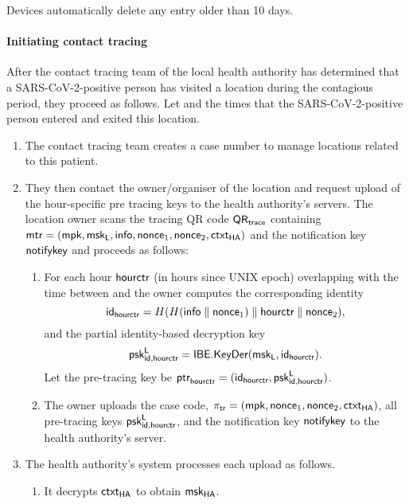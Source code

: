 Devices automatically delete any entry older than 10 days.

\paragraph{Initiating contact tracing}
After the contact tracing team of the local health authority has determined that a SARS-CoV-2-positive person has visited a location during the contagious period, they proceed as follows. Let \entryplus and \exitplus the times that the SARS-CoV-2-positive person entered and exited this location.
\begin{enumerate}
\item The contact tracing team creates a case number to manage locations related to this patient.
\item They then contact the owner/organiser of the location and request upload of the hour-specific pre tracing keys to the health authority's servers. The location owner scans the tracing QR code $\textsf{QR}_{\textsf{trace}}$ containing $\textsf{mtr} = (\textsf{mpk}, \textsf{msk}_{\textsf{L}}, \textsf{info}, \textsf{nonce}_1,\textsf{nonce}_2, \textsf{ctxt}_{\textsf{HA}})$ and the notification key $\textsf{notifykey}$ and proceeds as follows:
  \begin{enumerate}
  \item For each hour $\textsf{hourctr}$ (in hours since UNIX epoch) overlapping with the time between \entryplus and \exitplus the owner computes the corresponding identity
    \begin{equation*}
      \textsf{id}_{\textsf{hourctr}} = H( H(\textsf{info} \parallel \textsf{nonce}_1) \parallel \textsf{hourctr} \parallel \textsf{nonce}_2),
    \end{equation*}
    and the partial identity-based decryption key
    \begin{equation*}
      \textsf{psk}_{\textsf{id},\textsf{hourctr}}^{\textsf{L}} = \textsf{IBE.KeyDer}(\textsf{msk}_{\textsf{L}}, \textsf{id}_{\textsf{hourctr}}).
    \end{equation*}
    Let the pre-tracing key be $\textsf{ptr}_{\textsf{hourctr}} = (\textsf{id}_{\textsf{hourctr}}, \textsf{psk}_{\textsf{id},\textsf{hourctr}}^{\textsf{L}})$.
    \item The owner uploads the case code, $\pi_{\textsf{tr}} = (\textsf{mpk},\allowbreak \textsf{nonce}_1,\allowbreak \textsf{nonce}_2, \textsf{ctxt}_{\textsf{HA}})$, all pre-tracing keys $\textsf{psk}_{\textsf{id},\textsf{hourctr}}^{\textsf{L}}$, and the notification key $\textsf{notifykey}$ to the health authority's server.
  \end{enumerate}
\item The health authority's system processes each upload as follows.
  \begin{enumerate}
  \item It decrypts $\textsf{ctxt}_{\textsf{HA}}$ to obtain $\textsf{msk}_{\textsf{HA}}$.

\end{enumerate}
\end{enumerate}
